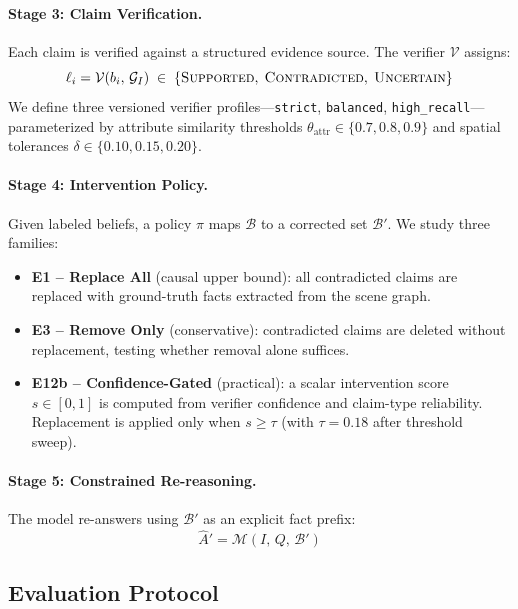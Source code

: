 \paragraph{Stage 3: Claim Verification.}
Each claim is verified against a structured evidence source. The verifier $\mathcal{V}$
assigns:
\begin{equation}
  \ell_i = \mathcal{V}(b_i,\, \mathcal{G}_I) \;\in\;
  \{\textsc{Supported},\;\textsc{Contradicted},\;\textsc{Uncertain}\}
  \label{eq:verifier}
\end{equation}
We define three versioned verifier profiles---\texttt{strict}, \texttt{balanced},
\texttt{high\_recall}---parameterized by attribute similarity thresholds
$\theta_{\text{attr}} \in \{0.7, 0.8, 0.9\}$ and spatial tolerances
$\delta \in \{0.10, 0.15, 0.20\}$.

\paragraph{Stage 4: Intervention Policy.}
Given labeled beliefs, a policy $\pi$ maps $\mathcal{B}$ to a corrected set
$\mathcal{B}'$. We study three families:
\begin{itemize}[leftmargin=1.5em,itemsep=1pt,topsep=2pt]
  \item \textbf{E1 -- Replace All} (causal upper bound): all contradicted claims are
    replaced with ground-truth facts extracted from the scene graph.
  \item \textbf{E3 -- Remove Only} (conservative): contradicted claims are deleted
    without replacement, testing whether removal alone suffices.
  \item \textbf{E12b -- Confidence-Gated} (practical): a scalar intervention score
    $s \in [0,1]$ is computed from verifier confidence and claim-type reliability.
    Replacement is applied only when $s \geq \tau$ (with $\tau{=}0.18$ after threshold
    sweep).
\end{itemize}

\paragraph{Stage 5: Constrained Re-reasoning.}
The model re-answers using $\mathcal{B}'$ as an explicit fact prefix:
\begin{equation}
  \hat{A}' = \mathcal{M}(I,\, Q,\, \mathcal{B}')
  \label{eq:reread}
\end{equation}

\subsection{Evaluation Protocol}

